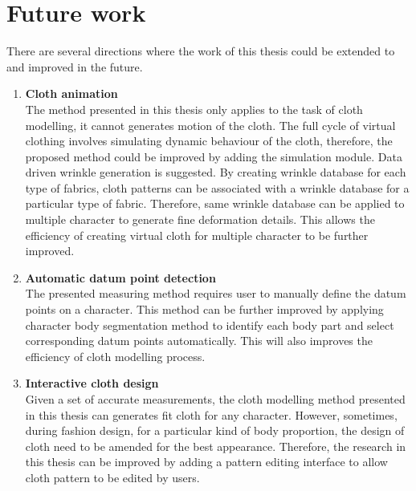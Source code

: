\section{Future work}
There are several directions where the work of this thesis could be extended to and improved in the future.

\begin{enumerate}
  \item \textbf{Cloth animation}\\
  The method presented in this thesis only applies to the task of cloth modelling, it cannot generates motion of the cloth. The full cycle of virtual clothing involves simulating dynamic behaviour of the cloth, therefore, the proposed method could be improved by adding the simulation module. Data driven wrinkle generation is suggested. By creating wrinkle database for each type of fabrics, cloth patterns can be associated with a wrinkle database for a particular type of fabric. Therefore, same wrinkle database can be applied to multiple character to generate fine deformation details. This allows the efficiency of creating virtual cloth for multiple character to be further improved. 

  \item \textbf{Automatic datum point detection}\\
  The presented measuring method requires user to manually define the datum points on a character. This method can be further improved by applying character body segmentation method  to identify each body part and select corresponding datum points automatically. This will also improves the efficiency of cloth modelling process.  
  
  \item \textbf{Interactive cloth design}\\
 Given a set of accurate measurements, the cloth modelling method presented in this thesis can generates fit cloth for any character. However, sometimes, during fashion design, for a particular kind of body proportion, the design of cloth need to be amended for the best appearance. Therefore, the research in this thesis can be improved by adding a pattern editing interface to allow cloth pattern to be edited by users.
  

\end{enumerate}




\ifx\isEmbedded\undefined


\pagebreak

\fi
